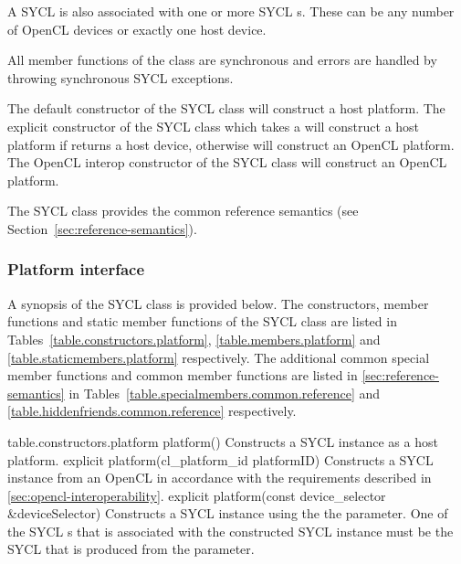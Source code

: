 A SYCL  is also associated with one or more SYCL s. These can be any number of OpenCL devices or exactly one host device.

All member functions of the  class are synchronous and errors are handled by throwing synchronous SYCL exceptions.

The default constructor of the SYCL  class will construct
a host platform. The explicit constructor of the SYCL 
class which takes a  will construct a host platform
if  returns a host device, otherwise will construct
an OpenCL platform. The OpenCL interop constructor of the SYCL
 class will construct an OpenCL platform.

The SYCL  class provides the common reference semantics
(see Section~\ref{sec:reference-semantics}).

\subsubsection{Platform interface}

A synopsis of the SYCL  class is provided below. The constructors, member functions and static member functions of the SYCL  class are listed in Tables~\ref{table.constructors.platform}, \ref{table.members.platform} and \ref{table.staticmembers.platform} respectively. The additional common special member functions and common member functions are listed in \ref{sec:reference-semantics} in Tables~\ref{table.specialmembers.common.reference} and \ref{table.hiddenfriends.common.reference} respectively.



{table.constructors.platform}
  \addRow
    {platform()}
    {
      Constructs a SYCL  instance as a host platform.
    }
  \addRow
    {explicit platform(cl_platform_id platformID)}
    {    
     Constructs a SYCL  instance from an OpenCL  in accordance with the requirements described in \ref{sec:opencl-interoperability}.
    }
  \addRow
    {explicit platform(const device_selector \&deviceSelector)}
    {
      Constructs a SYCL  instance using the the  parameter. One of the SYCL s that is associated with the constructed SYCL  instance must be the SYCL  that is produced from the  parameter.
    }
\completeTable

